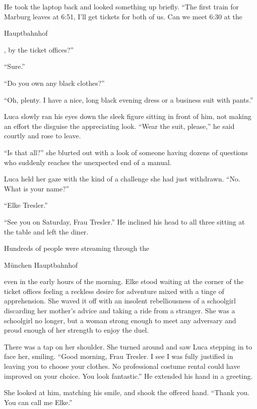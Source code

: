 He took the laptop back and looked something up briefly. ``The first train for Marburg leaves at 6:51, I'll get tickets for both of us. Can we meet 6:30 at the \begin{otherlanguage}{ngerman}Hauptbahnhof\end{otherlanguage}, by the ticket offices?''

``Sure.''

``Do you own any black clothes?''

``Oh, plenty. I have a nice, long black evening dress or a business suit with pants.''

Luca slowly ran his eyes down the sleek figure sitting in front of him, not making an effort the disguise the appreciating look. ``Wear the suit, please,'' he said courtly and rose to leave.

``Is that all?'' she blurted out with a look of someone having dozens of questions who suddenly reaches the unexpected end of a manual.

Luca held her gaze with the kind of a challenge she had just withdrawn. ``No. What is your name?''

``Elke Tresler.''

``See you on Saturday, Frau Tresler.'' He inclined his head to all three sitting at the table and left the diner.

\sectionline

Hundreds of people were streaming through the \begin{otherlanguage}{ngerman}München Hauptbahnhof\end{otherlanguage}{} even in the early hours of the morning. Elke stood waiting at the corner of the ticket offices feeling a reckless desire for adventure mixed with a tinge of apprehension. She waved it off with an insolent rebelliousness of a schoolgirl discarding her mother's advice and taking a ride from a stranger. She was a schoolgirl no longer, but a woman strong enough to meet any adversary and proud enough of her strength to enjoy the duel.

There was a tap on her shoulder. She turned around and saw Luca stepping in to face her, smiling. ``Good morning, Frau Tresler. I see I was fully justified in leaving you to choose your clothes. No professional costume rental could have improved on your choice. You look fantastic.'' He extended his hand in a greeting.

She looked at him, matching his smile, and shook the offered hand. ``Thank you. You can call me Elke.''

